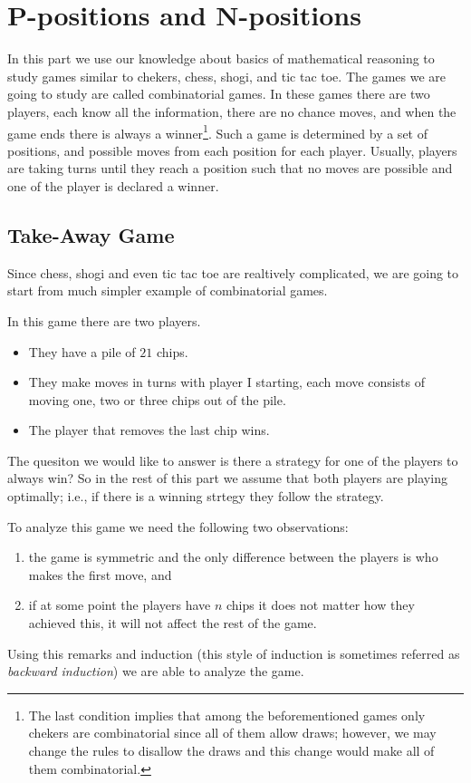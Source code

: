 \chapter{P-positions and N-positions}
\label{chapter:combinatorial-games}
In this part we use our knowledge about basics of mathematical reasoning
to study games similar to chekers, chess, shogi, and tic tac toe. The games we
are going to study are called combinatorial games. In these games there are two
players, each know all the information, there are no chance moves, and when the
game ends there is always a winner\footnote{%
  The last condition implies that among the beforementioned games only chekers
  are combinatorial since all of them allow draws; however, we may change the
  rules to disallow the draws and this change would make all of them
  combinatorial.
}. Such a game is determined by a set of positions, and possible moves
from each position for each player. Usually, players are taking turns until
they reach a position such that no moves are possible and one of the player is
declared a winner.

\section{Take-Away Game}

Since chess, shogi and even tic tac toe are realtively complicated,
we are going to start from much simpler example of combinatorial games.
\begin{game}
\label{game:take-away-21-3-2-1}
  In this game there are two players.
  \begin{itemize}
    \item They have a pile of $21$ chips.
    \item They make moves in turns with player I starting,
      each move consists of moving one, two or three chips out of the pile.
    \item The player that removes the last chip wins.
  \end{itemize}
\end{game}
The quesiton we would like to answer is there a strategy for one of the players
to always win? So in the rest of this part we assume that both players are
playing optimally; i.e., if there is a winning strtegy they follow the strategy.

To analyze this game we need the following two observations:
\begin{enumerate}
  \item the game is symmetric and the only difference between the players is
    who makes the first move, and
  \item if at some point the players have $n$ chips it does not matter how they
    achieved this, it will not affect the rest of the game.
\end{enumerate}
Using this remarks and induction (this style of induction is sometimes
referred as \emph{backward induction}) we are able to analyze the game.

